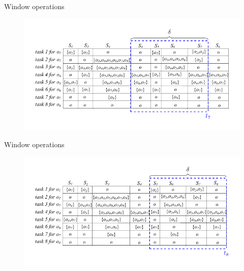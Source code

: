 \documentclass{beamer}
\begin{document}
\begin{frame}{Window operations}
    \centering
    \begin{figure}
        \includegraphics[width=.9\textwidth]{figures/Window04}
    \end{figure}    
\end{frame}
\begin{frame}{Window operations}
    \centering
    \begin{figure}
        \includegraphics[width=.9\textwidth]{figures/Window05}
    \end{figure}    
\end{frame}
\end{document}
